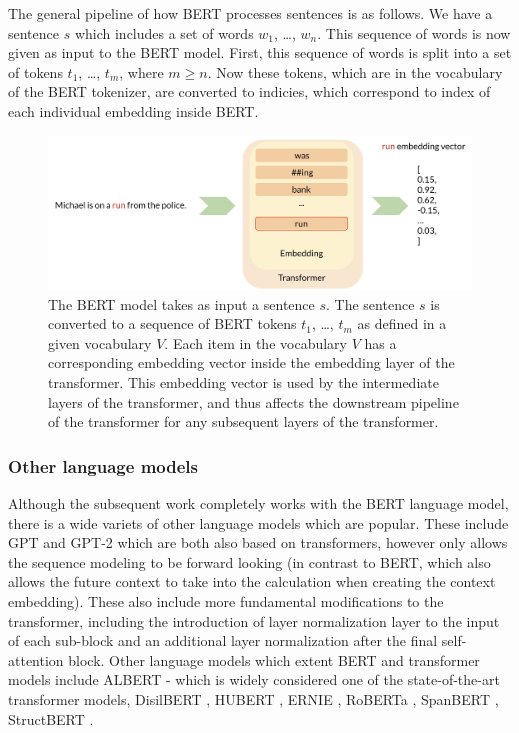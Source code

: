 \documentclass[a4paper,12pt,twoside,openright]{report}
\begin{document}
The general pipeline of how BERT processes sentences is as follows.
We have a sentence $s$ which includes a set of words $w_1$, \ldots, $w_n$.
This sequence of words is now given as input to the BERT model.
First, this sequence of words is split into a set of tokens $t_1$, \ldots, $t_m$, where $m \geq n$.
Now these tokens, which are in the vocabulary of the BERT tokenizer, are converted to indicies, which correspond to index of each individual embedding inside BERT.



\begin{figure}[h]
	\center
  \includegraphics[width=\linewidth]{./assets/experiments/pipeline_vanilla_BERT.png}
  \caption{The BERT model takes as input a sentence $s$. The sentence $s$ is converted to a sequence of BERT tokens $t_1$, \ldots, $t_m$ as defined in a given vocabulary $V$.
Each item in the vocabulary $V$ has a corresponding embedding vector inside the embedding layer of the transformer.
This embedding vector is used by the intermediate layers of the transformer, and thus affects the downstream pipeline of the transformer for any subsequent layers of the transformer.
}
  \label{fig:BERT_vanilla_pipeline}
\end{figure}

\subsubsection{Other language models}

Although the subsequent work completely works with the BERT language model, there is a wide variets of other language models which are popular.
These include GPT \cite{radford18} and GPT-2 \cite{radford19} which are both also based on transformers, however only allows the sequence modeling to be forward looking (in contrast to BERT, which also allows the future context to take into the calculation when creating the context embedding).
These also include more fundamental modifications to the transformer, including the introduction of layer normalization \cite{ba16} layer to the input of each sub-block and an additional layer normalization after the final self-attention block. 
Other language models which extent BERT and transformer models include ALBERT \cite{lan20} - which is widely considered one of the state-of-the-art transformer models, DisilBERT \cite{sanh19}, HUBERT \cite{moradshahi19}, ERNIE \cite{sun19}, RoBERTa \cite{liu19}, SpanBERT \cite{joshi19}, StructBERT \cite{wang19d}.
\end{document}
